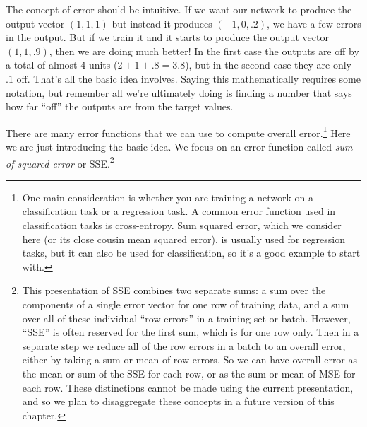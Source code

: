 
The concept of error should be intuitive. If we want our network to produce the output vector $(1,1,1)$ but instead it produces $(-1,0,.2)$, we have a few errors in the output. But if we train it and it starts to produce the output vector $(1,1,.9)$, then we are doing much better! In the first case the outputs are off by a total of almost 4 units ($2 + 1 + .8 = 3.8$), but in the second case they are only $.1$ off. That's all the basic idea involves. Saying this mathematically requires some notation, but remember all we're ultimately doing is finding a number that says how far ``off'' the outputs are from the target values.

There are many error functions that we can use to compute overall error.\footnote{One main consideration is whether you are training a network on a classification task or a regression task.  A common error function used in classification tasks is cross-entropy.  Sum squared error, which we consider here (or its close cousin mean squared error), is usually used for regression tasks, but it can also be used for classification, so it's a good example to start with.} Here we are just introducing the basic idea. We focus on an error function called \emph{sum of squared error} or SSE.\footnote{This presentation of SSE combines two separate sums: a sum over the components of a single error vector for one row of training data, and a sum over all of these individual ``row errors'' in a training set or batch. However, ``SSE'' is often reserved for the first sum, which is for one row only.  Then in a separate step we reduce all of the row errors in a batch to an overall error, either by taking a sum or mean of row errors. So we can have overall error as the mean or sum of the SSE for each row, or as the sum or mean of MSE for each row. These distinctions cannot be made using the current presentation, and so we plan to disaggregate these concepts in a future version of this chapter.}

